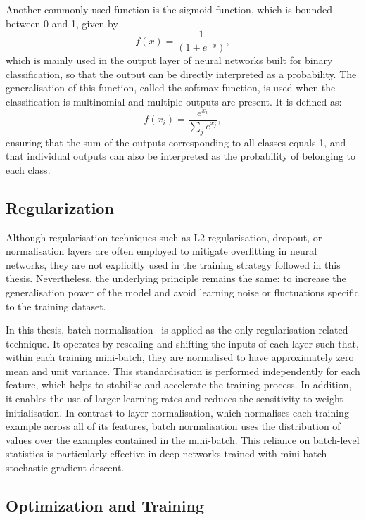 Another commonly used function is the sigmoid function, which is bounded between 0 and 1, given by
\begin{equation}
  f (x) = \frac{1}{(1 +e^{−x})},
\end{equation}
which is mainly used in the output layer of neural networks built for binary classification, so that the output can be directly interpreted as a probability. The generalisation of this function, called the softmax function, is used when the classification is multinomial and multiple outputs are present. It is defined as:
\begin{equation}
    f (x_{i}) = \frac{e^{x_{i}}}{\sum_{j}e^{x_{j}}},
\end{equation}
ensuring that the sum of the outputs corresponding to all classes equals 1, and that individual outputs can also be interpreted as the probability of belonging to each class.

\subsection{Regularization}

Although regularisation techniques such as L2 regularisation, dropout, or normalisation layers are often employed to mitigate overfitting in neural networks, they are not explicitly used in the training strategy followed in this thesis. Nevertheless, the underlying principle remains the same: to increase the generalisation power of the model and avoid learning noise or fluctuations specific to the training dataset.

In this thesis, batch normalisation~\cite{ioffe2015batchnormalizationacceleratingdeep} is applied as the only regularisation-related technique. It operates by rescaling and shifting the inputs of each layer such that, within each training mini-batch, they are normalised to have approximately zero mean and unit variance. This standardisation is performed independently for each feature, which helps to stabilise and accelerate the training process. In addition, it enables the use of larger learning rates and reduces the sensitivity to weight initialisation. In contrast to layer normalisation, which normalises each training example across all of its features, batch normalisation uses the distribution of values over the examples contained in the mini-batch. This reliance on batch-level statistics is particularly effective in deep networks trained with mini-batch stochastic gradient descent.

\subsection{Optimization and Training}

